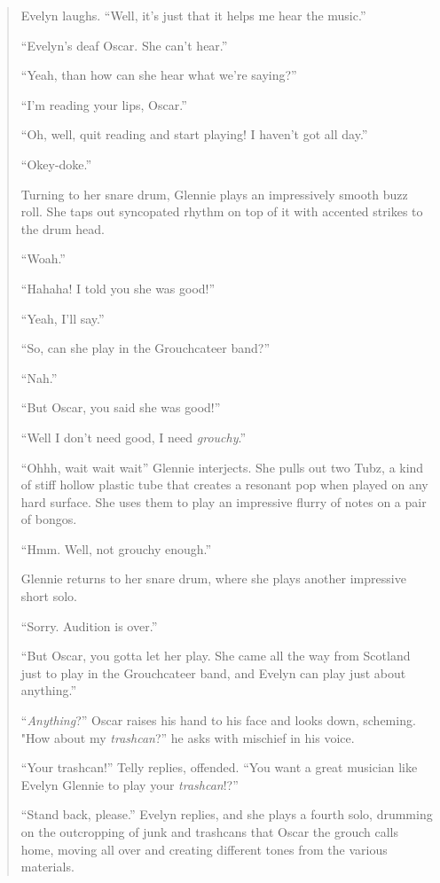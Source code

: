 \documentclass[12pt,letterpaper]{article}
\begin{document}
\begin{quote}
	Evelyn laughs. ``Well, it's just that it helps me hear the music.''

	``Evelyn's deaf Oscar. She can't hear.''

	``Yeah, than how can she hear what we're saying?''

	``I'm reading your lips, Oscar.''

	``Oh, well, quit reading and start playing! I haven't got all day.''

	``Okey-doke.''

	Turning to her snare drum, Glennie plays an impressively smooth buzz 
	roll. She taps out syncopated rhythm on top of it with accented strikes
	to the drum head.

	``Woah.''

	``Hahaha! I told you she was good!''

	``Yeah, I'll say.''

	``So, can she play in the Grouchcateer band?''

	``Nah.''

	``But Oscar, you said she was good!''

	``Well I don't need good, I need \textit{grouchy}.''

	``Ohhh, wait wait wait'' Glennie interjects. She pulls out two Tubz, a 
	kind of stiff hollow plastic tube that creates a resonant pop when 
	played on any hard surface. She uses them to play an impressive flurry
	of notes on a pair of bongos.  

	``Hmm. Well, not grouchy enough.''

	Glennie returns to her snare drum, where she plays another impressive 
	short solo.  

	``Sorry. Audition is over.''

	``But Oscar, you gotta let her play. She came all the way from Scotland
	just to play in the Grouchcateer band, and Evelyn can play just about 
	anything.''

	``\textit{Anything}?'' Oscar raises his hand to his face and looks down,
	 scheming. "How about my \textit{trashcan}?'' he asks with mischief in 
	his voice.

	``Your trashcan!'' Telly replies, offended. ``You want a great musician
	like Evelyn Glennie to play your \textit{trashcan}!?''

	``Stand back, please.'' Evelyn replies, and she plays a fourth solo, 
	drumming on the outcropping of junk and trashcans that Oscar the grouch
	calls home, moving all over and creating different tones from the 
	various materials. 


\end{quote}
\end{document}
